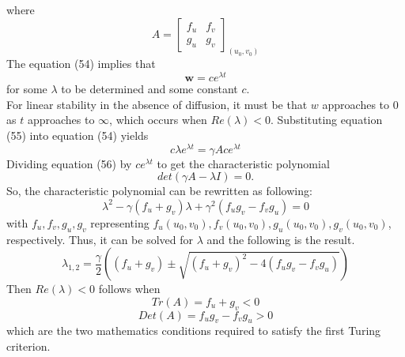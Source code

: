 \documentclass[]{article}
\numberwithin{equation}{section}		%
\begin{document}
where $$A=\begin{bmatrix}
f_u & f_v \\
g_u & g_v
\end{bmatrix}_{(u_0,v_0)} $$
The equation (54) implies that
\begin{equation}
\textbf{w}=ce^{\lambda t}
\end{equation}
for some $\lambda$ to be determined and some constant $c$.
\\
For linear stability in the absence of diffusion, it must be that $w$ approaches to $0$ as $t$ approaches to $\infty$, which occurs when $Re(\lambda) < 0 $. Substituting equation (55) into equation (54) yields
\begin{equation}
c\lambda e^{\lambda t}=\gamma A ce^{\lambda t}
\end{equation}
Dividing equation (56) by $ce^{\lambda t}$ to get the characteristic polynomial
$$det(\gamma A - \lambda I)=0.$$ So, the characteristic polynomial can be rewritten as following:
\begin{equation}
\lambda^2 - \gamma(f_u + g_v)\lambda + \gamma^2(f_u g_v - f_v g_u)=0
\end{equation}
with $f_u, f_v, g_u, g_v$ representing $f_u(u_0,v_0), f_v(u_0,v_0), g_u(u_0,v_0), g_v(u_0,v_0)$, respectively. Thus, it can be solved for $\lambda$ and the following is the result.
\begin{equation}
\lambda_{1,2} = \frac{\gamma}{2}((f_u+g_v)\pm\sqrt{(f_u+g_v)^2-4(f_u g_v - f_v g_u)})
\end{equation}
Then $Re(\lambda) < 0$ follows when
\begin{equation}
Tr(A) = f_u + g_v < 0
\end{equation}
\begin{equation}
Det(A) = f_u g_v - f_v g_u > 0
\end{equation}
which are the two mathematics conditions required to satisfy the first Turing criterion.
\end{document}
